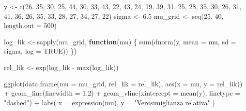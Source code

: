 \documentclass[
  italian,
  letterpaper,
  a4paper,
  11pt,
  open=any]{scrbook}
\newenvironment{Shaded}{\begin{snugshade}}{\end{snugshade}}
\newcommand{\AttributeTok}[1]{\textcolor[rgb]{0.40,0.45,0.13}{#1}}
\newcommand{\ConstantTok}[1]{\textcolor[rgb]{0.56,0.35,0.01}{#1}}
\newcommand{\ControlFlowTok}[1]{\textcolor[rgb]{0.00,0.23,0.31}{\textbf{#1}}}
\newcommand{\DecValTok}[1]{\textcolor[rgb]{0.68,0.00,0.00}{#1}}
\newcommand{\FloatTok}[1]{\textcolor[rgb]{0.68,0.00,0.00}{#1}}
\newcommand{\FunctionTok}[1]{\textcolor[rgb]{0.28,0.35,0.67}{#1}}
\newcommand{\NormalTok}[1]{\textcolor[rgb]{0.00,0.23,0.31}{#1}}
\newcommand{\OtherTok}[1]{\textcolor[rgb]{0.00,0.23,0.31}{#1}}
\newcommand{\SpecialCharTok}[1]{\textcolor[rgb]{0.37,0.37,0.37}{#1}}
\newcommand{\StringTok}[1]{\textcolor[rgb]{0.13,0.47,0.30}{#1}}
\theoremstyle{plain}
\theoremstyle{definition}
\theoremstyle{definition}
\theoremstyle{remark}
\begin{document}
\begin{Shaded}
\begin{Highlighting}[]
\NormalTok{y }\OtherTok{\textless{}{-}} \FunctionTok{c}\NormalTok{(}\DecValTok{26}\NormalTok{, }\DecValTok{35}\NormalTok{, }\DecValTok{30}\NormalTok{, }\DecValTok{25}\NormalTok{, }\DecValTok{44}\NormalTok{, }\DecValTok{30}\NormalTok{, }\DecValTok{33}\NormalTok{, }\DecValTok{43}\NormalTok{, }\DecValTok{22}\NormalTok{, }\DecValTok{43}\NormalTok{, }\DecValTok{24}\NormalTok{, }\DecValTok{19}\NormalTok{, }\DecValTok{39}\NormalTok{, }\DecValTok{31}\NormalTok{, }\DecValTok{25}\NormalTok{,}
       \DecValTok{28}\NormalTok{, }\DecValTok{35}\NormalTok{, }\DecValTok{30}\NormalTok{, }\DecValTok{26}\NormalTok{, }\DecValTok{31}\NormalTok{, }\DecValTok{41}\NormalTok{, }\DecValTok{36}\NormalTok{, }\DecValTok{26}\NormalTok{, }\DecValTok{35}\NormalTok{, }\DecValTok{33}\NormalTok{, }\DecValTok{28}\NormalTok{, }\DecValTok{27}\NormalTok{, }\DecValTok{34}\NormalTok{, }\DecValTok{27}\NormalTok{, }\DecValTok{22}\NormalTok{)}
\NormalTok{sigma }\OtherTok{\textless{}{-}} \FloatTok{6.5}
\NormalTok{mu\_grid }\OtherTok{\textless{}{-}} \FunctionTok{seq}\NormalTok{(}\DecValTok{25}\NormalTok{, }\DecValTok{40}\NormalTok{, }\AttributeTok{length.out =} \DecValTok{500}\NormalTok{)}

\NormalTok{log\_lik }\OtherTok{\textless{}{-}} \FunctionTok{sapply}\NormalTok{(mu\_grid, }\ControlFlowTok{function}\NormalTok{(mu) \{}
  \FunctionTok{sum}\NormalTok{(}\FunctionTok{dnorm}\NormalTok{(y, }\AttributeTok{mean =}\NormalTok{ mu, }\AttributeTok{sd =}\NormalTok{ sigma, }\AttributeTok{log =} \ConstantTok{TRUE}\NormalTok{))}
\NormalTok{\})}

\NormalTok{rel\_lik }\OtherTok{\textless{}{-}} \FunctionTok{exp}\NormalTok{(log\_lik }\SpecialCharTok{{-}} \FunctionTok{max}\NormalTok{(log\_lik))}

\FunctionTok{ggplot}\NormalTok{(}\FunctionTok{data.frame}\NormalTok{(}\AttributeTok{mu =}\NormalTok{ mu\_grid, }\AttributeTok{rel\_lik =}\NormalTok{ rel\_lik),}
       \FunctionTok{aes}\NormalTok{(}\AttributeTok{x =}\NormalTok{ mu, }\AttributeTok{y =}\NormalTok{ rel\_lik)) }\SpecialCharTok{+}
  \FunctionTok{geom\_line}\NormalTok{(}\AttributeTok{linewidth =} \FloatTok{1.2}\NormalTok{) }\SpecialCharTok{+}
  \FunctionTok{geom\_vline}\NormalTok{(}\AttributeTok{xintercept =} \FunctionTok{mean}\NormalTok{(y), }\AttributeTok{linetype =} \StringTok{"dashed"}\NormalTok{) }\SpecialCharTok{+}
  \FunctionTok{labs}\NormalTok{(}
    \AttributeTok{x =} \FunctionTok{expression}\NormalTok{(mu),}
    \AttributeTok{y =} \StringTok{"Verosimiglianza relativa"}
\NormalTok{  )}
\end{Highlighting}
\end{Shaded}
\end{document}
